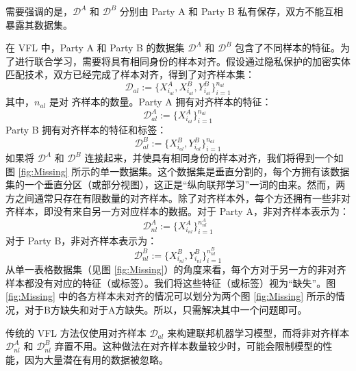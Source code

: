 需要强调的是，$\mathcal{D}^A$ 和 $\mathcal{D}^B$ 分别由 Party A 和 Party B 私有保存，双方不能互相暴露其数据集。

在 VFL 中，Party A 和 Party B 的数据集 $\mathcal{D}^A$ 和 $\mathcal{D}^B$ 包含了不同样本的特征。为了进行联合学习，需要将具有相同身份的样本对齐。假设通过隐私保护的加密实体匹配技术，双方已经完成了样本对齐，得到了对齐样本集：
\begin{equation}
	\mathcal{D}_{al} := \{X^A_{i_{al}}, X^B_{i_{al}}, Y^B_{i_{al}}\}_{i=1}^{n_{al}}
\end{equation}
其中，$n_{al}$ 是对 齐样本的数量。Party A 拥有对齐样本的特征：
\begin{equation}
	\mathcal{D}^A_{al} := \{X^A_{i_{al}}\}_{i=1}^{n_{al}}
\end{equation}
Party B 拥有对齐样本的特征和标签：
\begin{equation}
	\mathcal{D}^B_{al} := \{X^B_{i_{al}}, Y^B_{i_{al}}\}_{i=1}^{n_{al}}
\end{equation}
如果将 $\mathcal{D}^A$ 和 $\mathcal{D}^B$ 连接起来，并使具有相同身份的样本对齐，我们将得到一个如图 \ref{fig:Missing} 所示的单一数据集。这个数据集是垂直分割的，每个方拥有该数据集的一个垂直分区（或部分视图），这正是“纵向联邦学习”一词的由来。然而，两方之间通常只存在有限数量的对齐样本。除了对齐样本外，每个方还拥有一些非对齐样本，即没有来自另一方对应样本的数据。对于 Party A，非对齐样本表示为：
\begin{equation}
	\mathcal{D}^A_{nl} := \{X^A_{i_{nl}}\}_{i=1}^{n^A_{nl}}
\end{equation}
对于 Party B，非对齐样本表示为：
\begin{equation}
	\mathcal{D}^B_{nl} := \{X^B_{i_{nl}}, Y^B_{i_{nl}}\}_{i=1}^{n^B_{nl}}
\end{equation}
从单一表格数据集（见图 \ref{fig:Missing}）的角度来看，每个方对于另一方的非对齐样本都没有对应的特征（或标签）。我们将这些特征（或标签）视为“缺失”。图 \ref{fig:Missing} 中的各方样本未对齐的情况可以划分为两个图 \ref{fig:Missing} 所示的情况，对于B方缺失和对于A方缺失。所以，只需解决其中一个问题即可。

传统的 VFL 方法仅使用对齐样本 $\mathcal{D}_{al}$ 来构建联邦机器学习模型，而将非对齐样本 $\mathcal{D}^A_{nl}$ 和 $\mathcal{D}^B_{nl}$ 弃置不用。这种做法在对齐样本数量较少时，可能会限制模型的性能，因为大量潜在有用的数据被忽略。

